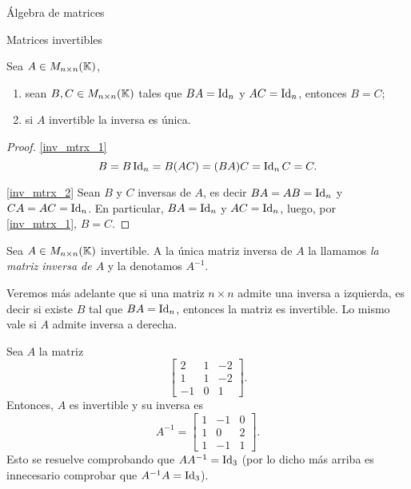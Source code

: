 \begin{chapter}{\'Algebra de matrices}
\begin{section}{Matrices invertibles}
            \begin{proposicion}
                Sea $A  \in M_{n\times n}(\mathbb K)$, 
                \begin{enumerate}
                    \item\label{inv_mtrx_1}    sean $B, C \in M_{n \times n}(\mathbb K)$ tales que $BA =\operatorname{Id}_n$ y $AC = \operatorname{Id}_n$, entonces $B=C$;
                    \item\label{inv_mtrx_2}  si $A$ invertible la inversa es única.
                \end{enumerate}
            \end{proposicion}
            \begin{proof} \ref{inv_mtrx_1}
                \begin{equation*}
                B = B\operatorname{Id}_n = B(AC) = (BA)C = \operatorname{Id}_nC = C.
                \end{equation*}
                
                \ref{inv_mtrx_2} Sean $B$ y $C$ inversas de $A$, es decir $BA=AB=\operatorname{Id}_n$ y  $CA=AC=\operatorname{Id}_n$. En particular, $BA=\operatorname{Id}_n$ y $AC= \operatorname{Id}_n$, luego, por \ref{inv_mtrx_1}, $B=C$.  
            \end{proof}
            
            
            
            \begin{definicion}
                Sea $A\in M_{n\times n}(\mathbb K)$ invertible. A la única matriz inversa de $A$ la llamamos \textit{la matriz inversa de $A$} y la denotamos $A^{-1}$.
            \end{definicion}
            
            Veremos más adelante que si una matriz $n \times n$ admite una inversa a izquierda,  es decir si existe $B$ tal que $BA=\operatorname{Id}_n$, entonces la matriz es invertible. Lo mismo vale si $A$  admite inversa a derecha.
            
            \begin{ejemplo*}
                Sea $A$ la matriz 
                \begin{equation*}
                \begin{bmatrix} 2&1&-2\\ 1&1&-2\\ -1&0&1
                \end{bmatrix}.
                \end{equation*}
                Entonces,  $A$ es invertible y su inversa es
                \begin{equation*}
                A^{-1} = \begin{bmatrix} 1&-1&0\\ 1&0&2\\ 1&-1&1
                \end{bmatrix}.
                \end{equation*}
                Esto se resuelve comprobando que $AA^{-1}=\operatorname{Id}_3$ (por lo dicho más arriba es innecesario comprobar que $A^{-1}A=\operatorname{Id}_3$).
            \end{ejemplo*} 
            

\end{section}
\end{chapter}
